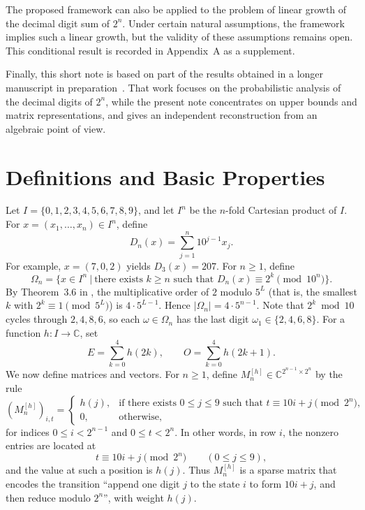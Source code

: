 \documentclass[11pt,a4paper]{article}
\theoremstyle{plain}
\begin{document}
The proposed framework can also be applied to the problem of linear growth of the decimal digit sum of \(2^n\).
Under certain natural assumptions, the framework implies such a linear growth, but the validity of these assumptions remains open.
This conditional result is recorded in Appendix~A as a supplement.

Finally, this short note is based on part of the results obtained in a longer manuscript in preparation~\cite{AuthorPrep}. That work focuses on the probabilistic analysis of the decimal digits of \(2^n\), while the present note concentrates on upper bounds and matrix representations, and gives an independent reconstruction from an algebraic point of view.



\section{Definitions and Basic Properties}\label{sec:basic}
Let $I=\{0,1,2,3,4,5,6,7,8,9\}$, and let $I^n$ be the $n$-fold Cartesian product of $I$.
For $x=(x_1,\dots,x_n)\in I^n$, define
\[
D_n(x)=\sum_{j=1}^n 10^{j-1} x_j .
\]
For example, $x=(7,0,2)$ yields $D_3(x)=207$.
For $n\ge 1$, define
\[
\Omega_n=\big \{ x\in I^n\ \big|\ \text{there exists } k\ge n \text{ such that } D_n(x)\equiv 2^k \pmod{10^n} \big \}.
\]
By Theorem~3.6 in \cite{nathanson2000}, the multiplicative order of $2$ modulo $5^L$ (that is, the smallest $k$ with $2^k\equiv 1 \pmod{5^L}$) is $4\cdot 5^{L-1}$.
Hence $|\Omega_n|=4\cdot 5^{n-1}$. Note that $2^k\bmod10$ cycles through $2,4,8,6$, so each $\omega\in\Omega_n$ has the last digit $\omega_1\in\{2,4,6,8\}$.
For a function $h:I\to\mathbb{C}$, set
\[
E=\sum_{k=0}^4 h(2k),\qquad O=\sum_{k=0}^4 h(2k+1).
\]
\medskip
We now define matrices and vectors.
For $n\ge 1$, define $M_n^{[h]} \in \mathbb{C}^{2^{n-1}\times 2^{n}}$ by the rule
\begin{equation}\label{eq:defMn}
(M_n^{[h]})_{i,t} =
\begin{cases}
h(j), & \text{if there exists } 0\le j\le 9 \text{ such that } t \equiv 10 i + j \pmod{2^n},\\[6pt]
0, & \text{otherwise},
\end{cases}
\end{equation}
for indices $0 \le i < 2^{n-1}$ and $0 \le t < 2^n$.
In other words, in row $i$, the nonzero entries are located at
\[
t \equiv 10 i + j \pmod{2^n}\qquad (0\le j\le 9),
\]
and the value at such a position is $h(j)$.
Thus $M_n^{[h]}$ is a sparse matrix that encodes the transition “append one digit $j$ to the state $i$ to form $10i+j$, and then reduce modulo $2^n$”, with weight $h(j)$.
\end{document}
